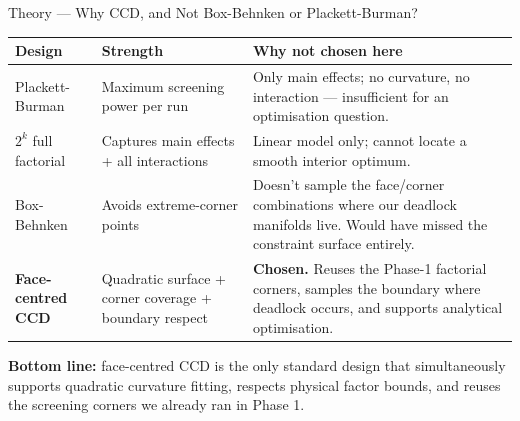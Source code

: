 \documentclass[aspectratio=169,10pt]{beamer}
\begin{document}
\begin{frame}{Theory --- Why CCD, and Not Box-Behnken or Plackett-Burman?}
  \footnotesize
  \begin{tabular}{p{}p{}p{}}
    \toprule
    Design & Strength & Why not chosen here \\
    \midrule
    Plackett-Burman & Maximum screening power per run & Only main effects; no curvature, no interaction --- insufficient for an optimisation question. \\
    \addlinespace
    $2^k$ full factorial & Captures main effects + all interactions & Linear model only; cannot locate a smooth interior optimum. \\
    \addlinespace
    Box-Behnken & Avoids extreme-corner points & Doesn't sample the face/corner combinations where our deadlock manifolds live. Would have missed the constraint surface entirely. \\
    \addlinespace
    \textbf{Face-centred CCD} & Quadratic surface + corner coverage + boundary respect & \textbf{Chosen.} Reuses the Phase-1 factorial corners, samples the boundary where deadlock occurs, and supports analytical optimisation. \\
    \bottomrule
  \end{tabular}

  \vspace{0.5em}
  \textbf{Bottom line:} face-centred CCD is the only standard design that simultaneously supports quadratic curvature fitting, respects physical factor bounds, and reuses the screening corners we already ran in Phase 1.
\end{frame}
\end{document}

